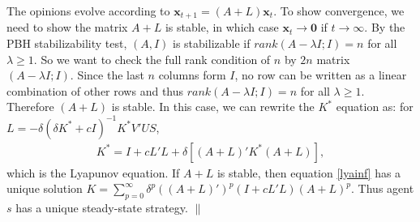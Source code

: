 \documentclass{article}
\newcommand{\x}{\mathbf{x}}
\newcommand{\wl}[1]{{\color{blue} #1}}
\begin{document}
The opinions evolve according to ${\x_{t+1}=(A+L)\x_t}$. To show convergence, we need to show the matrix $A+L$ is stable, in which case $\x_t\to \mathbf 0$ if $t\to \infty$. By the PBH stabilizability test, $(A,I)$ is stabilizable if $rank(A-\lambda I;I)=n$ for all $\lambda \geq 1$.
So we want to check the full rank condition of $n$ by $2n$ matrix $(A-\lambda I;I)$. 
Since the last $n$ columns form $I$, no row can be written as a linear combination of other rows and thus $rank(A-\lambda I;I)=n$ for all $\lambda \geq 1$. 
Therefore $(A+L)$ is stable. In this case, we can rewrite the $K^*$ equation as: for $L=-\delta(\delta K^*+cI)^{-1}K^*V'US$,
\begin{align}\label{lyainf}
K^*=I+cL'L+\delta[(A+ L)'K^*(A+L)],
\end{align}
which is the Lyapunov equation. If $A+L$ is stable, then equation \eqref{lyainf} has a unique solution $K=\sum_{p=0}^{\infty}\delta^p((A+L)')^p(I+cL'L)(A+L)^p$. Thus agent $s$ has a unique steady-state strategy. $\|$
\end{document}
